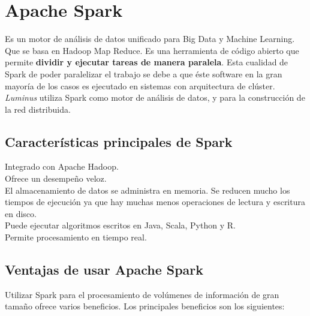 \section{Apache Spark}
Es un motor de análisis de datos unificado para Big Data y Machine Learning. Que se basa en Hadoop Map Reduce. Es una herramienta de código abierto que permite \textbf{dividir y ejecutar tareas de manera paralela}. Esta cualidad de Spark de poder paralelizar el trabajo se debe a que éste software en la gran mayoría de los casos es ejecutado en sistemas con arquitectura de clúster.\cite{spark} \emph{Luminus} utiliza Spark como motor de análisis de datos, y para la construcción de la red distribuida.\\
\newpage
\subsection{Características principales de Spark}
\begin{UClist}
	\UCli Integrado con Apache Hadoop.\\
	\UCli Ofrece un desempeño veloz.\\
	\UCli El almacenamiento de datos se administra en memoria. Se reducen mucho los tiempos de ejecución ya que hay muchas menos operaciones de lectura y escritura en disco.\\
	\UCli Puede ejecutar algoritmos escritos en Java, Scala, Python y R.\\
	\UCli Permite procesamiento en tiempo real.\\
\end{UClist}

\subsection{Ventajas de usar Apache Spark}
Utilizar Spark para el procesamiento de volúmenes de información de gran tamaño ofrece varios beneficios.\cite{spark} Los principales beneficios son los siguientes:\\

